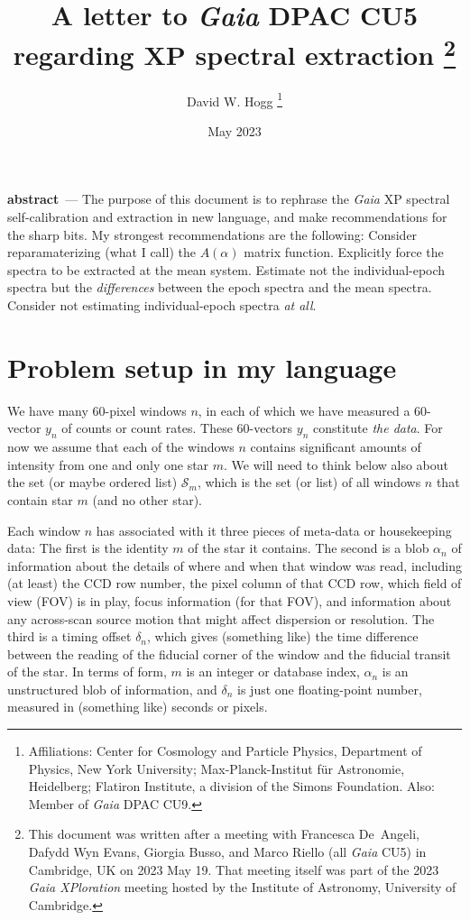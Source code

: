 \documentclass[11pt]{article}
\title{\bfseries
A letter to \textsl{Gaia} DPAC CU5 regarding XP spectral extraction%
\footnote{This document was written after a meeting with Francesca De~Angeli, Dafydd Wyn Evans, Giorgia Busso, and Marco Riello (all \textsl{Gaia} CU5) in Cambridge, UK on 2023 May 19. That meeting itself was part of the 2023 \textsl{Gaia XPloration} meeting hosted by the Institute of Astronomy, University of Cambridge.}}
\author{David W. Hogg%
\footnote{Affiliations: Center for Cosmology and Particle Physics, Department of Physics, New York University; Max-Planck-Institut f\"ur Astronomie, Heidelberg; Flatiron Institute, a division of the Simons Foundation. Also: Member of \textsl{Gaia} DPAC CU9.}}
\date{May 2023}
\renewcommand{\paragraph}[1]{\medskip\par\noindent\textbf{#1}~---}
\begin{document}
\maketitle\thispagestyle{empty}

\paragraph{abstract}
    The purpose of this document is to rephrase the \textsl{Gaia} XP spectral self-calibration and extraction in new language, and make recommendations for the sharp bits.
    My strongest recommendations are the following:
    Consider reparamaterizing (what I call) the $A(\alpha)$ matrix function.
    Explicitly force the spectra to be extracted at the mean system.
    Estimate not the individual-epoch spectra but the \emph{differences} between the epoch spectra and the mean spectra.
    Consider not estimating individual-epoch spectra \emph{at all}.

\section{Problem setup in my language}

We have many 60-pixel windows $n$, in each of which we have measured a 60-vector $y_n$ of counts or count rates.
These 60-vectors $y_n$ constitute \emph{the data}.
For now we assume that each of the windows $n$ contains significant amounts of intensity from one and only one star $m$.
We will need to think below also about the set (or maybe ordered list) $\mathscr{S}_m$, which is the set (or list) of all windows $n$ that contain star $m$ (and no other star).

Each window $n$ has associated with it three pieces of meta-data or housekeeping data:
The first is the identity $m$ of the star it contains.
The second is a blob $\alpha_n$ of information about the details of where and when that window was read, including (at least) the CCD row number, the pixel column of that CCD row, which field of view (FOV) is in play, focus information (for that FOV), and information about any across-scan source motion that might affect dispersion or resolution.
The third is a timing offset $\delta_n$, which gives (something like) the time difference between the reading of the fiducial corner of the window and the fiducial transit of the star.
In terms of form, $m$ is an integer or database index, $\alpha_n$ is an unstructured blob of information, and $\delta_n$ is just one floating-point number, measured in (something like) seconds or pixels.
\end{document}
